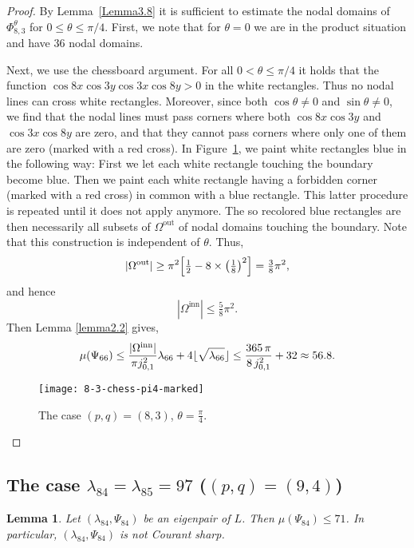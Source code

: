 \documentclass[a4paper,reqno,11pt]{amsart}
\newtheorem{lemma}[thm]{Lemma}
\theoremstyle{remark}
\theoremstyle{definition}
\numberwithin{equation}{section}
\begin{document}
\begin{proof}
By Lemma~\ref{Lemma3.8} it is sufficient to estimate the nodal domains
of $\Phi_{8,3}^\theta$ for $0\leq\theta\leq \pi/4$. First, we note that for
$\theta=0$ we are in the product situation and have $36$ nodal domains.

Next, we use the chessboard argument. For all $0<\theta\leq \pi/4$ it holds
that the function $\cos 8x\cos 3y\cos 3x\cos8y>0$ in the white rectangles. Thus no nodal lines can cross white 
rectangles. Moreover, since both $\cos\theta\neq 0$ and $\sin\theta\neq 0$, we
find that the nodal lines must pass corners where both $\cos8x\cos3y$ and
$\cos3x\cos8y$ are zero, and 
that they cannot pass corners where only one of them are zero (marked with a red
cross).  In Figure~\ref{fig:8-3-chess-pi4-marked}, we paint white 
rectangles blue in the following way: First we let each white rectangle touching 
the boundary become blue. Then we paint each white rectangle having
a forbidden corner (marked with a red cross) in common with a blue rectangle. 
This latter procedure is repeated until it does not apply anymore. The so 
recolored blue rectangles are then necessarily all subsets of 
$\Omega^{\text{out}}$ of nodal domains touching the boundary. Note that this construction is independent of $\theta$. Thus,
\[
|\Omega^{\text{out}}|\geq \pi^2\Bigl[\tfrac{1}{2}-8\times \bigl(\tfrac{1}{8}\bigr)^2\Bigr]
=\tfrac{3}{8}\pi^2,
\]
and hence
\[
|\Omega^{\text{inn}}|\leq \tfrac{5}{8}\pi^2.
\]
Then Lemma \ref{lemma2.2} gives,
\[
\mu(\Psi_{66})
\leq 
\frac{|\Omega^{\text{inn}}|}{\pi j_{0,1}^2}\lambda_{66}+4\lfloor\sqrt{\lambda_{66}}\rfloor
\leq \frac{365\,\pi}{8\, j_{0,1}^2}+32\approx 56.8.\qedhere
\]

\begin{figure}[htbp]
\centering
\texttt{[image: 8-3-chess-pi4-marked]}
\caption{The case $(p,q)= (8,3)$, $\theta = \frac \pi 4 $.}
\label{fig:8-3-chess-pi4-marked}
\end{figure}
\end{proof}

\newpage

\subsection{The case $\lambda_{84}=\lambda_{85}= 97$   ($(p,q)= (9,4)$)}
\begin{lemma}
\label{lem:9-4}
Let $(\lambda_{84},\Psi_{84})$ be an eigenpair of $L$. Then 
$\mu(\Psi_{84})\leq 71$. In particular, $(\lambda_{84},\Psi_{84})$ is not
Courant sharp.
\end{lemma}
\end{document}
